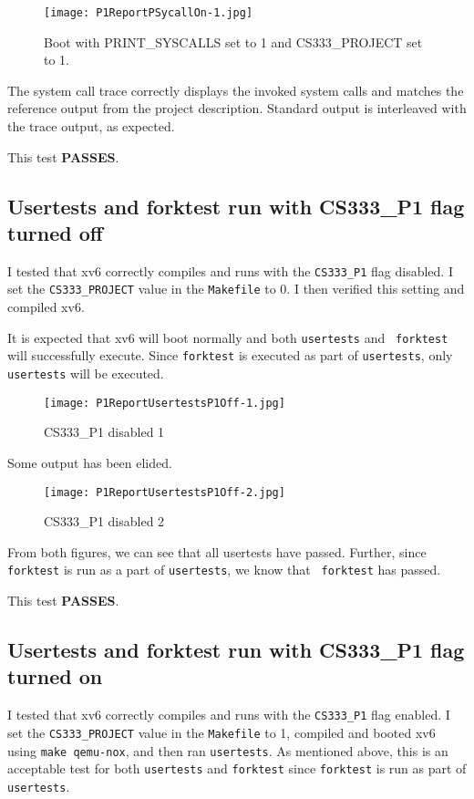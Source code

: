 \documentclass[11pt,letterpaper]{report}
\begin{document}
{  \begin{figure}[h!]
    \centering
    \texttt{[image: P1ReportPSycallOn-1.jpg]}
    \caption[Syscall Trace]{Boot with PRINT\_SYSCALLS set to 1 and CS333\_PROJECT set to 1.}
    \label{fig:syscalltrace-on}
  \end{figure}

  The system call trace correctly displays the invoked system calls and matches the reference output from the project description. Standard
  output is interleaved with the trace output, as expected.

  This test \textbf{PASSES}.

  \clearpage
  \subsection*{Usertests and forktest run with CS333\_P1 flag turned off}

  I tested that xv6 correctly compiles and runs with the {\tt CS333\_P1} flag
  disabled. I set the {\tt CS333\_PROJECT} value in the {\tt Makefile} to 0. I
  then verified this setting and compiled xv6.

  It is expected that xv6 will boot normally and both {\tt usertests} and {\tt
    forktest} will successfully execute. Since {\tt forktest} is executed as
  part of {\tt usertests}, only {\tt usertests} will be executed.

  \begin{figure}[h!]
    \centering
    \texttt{[image: P1ReportUsertestsP1Off-1.jpg]}
    \caption[CS333\_P1 disabled 1]{CS333\_P1 disabled 1}
    \label{fig:p1off1}
  \end{figure}

  Some output has been elided.

  \begin{figure}[h!]
    \centering
    \texttt{[image: P1ReportUsertestsP1Off-2.jpg]}
    \caption[CS333\_P1 disabled 2]{CS333\_P1 disabled 2}
    \label{fig:p1off2}
  \end{figure}


  From both figures, we can see that all usertests have passed. Further,
  since {\tt forktest} is run as a part of {\tt usertests}, we know that {\tt
    forktest} has passed.

  This test \textbf{PASSES}.

  \clearpage
  \subsection*{Usertests and forktest run with CS333\_P1 flag turned on}
  I tested that xv6 correctly compiles and runs with the {\tt CS333\_P1} flag
  enabled. I set the {\tt CS333\_PROJECT} value in the {\tt Makefile} to 1,
  compiled and booted xv6 using {\tt make qemu-nox}, and then ran {\tt usertests}. As mentioned above, this is an acceptable test for both 
  {\tt usertests} and {\tt forktest} since {\tt forktest} is run as part of {\tt usertests}.

}
\end{document}
